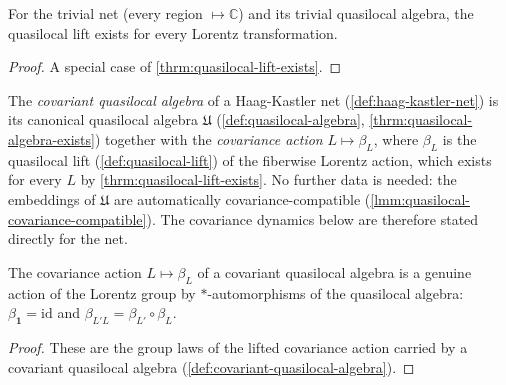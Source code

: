 \begin{theorem}
    \label{thrm:quasilocal-lift-trivial}
    \leanok
    For the trivial net (every region $\mapsto \mathbb{C}$) and its trivial quasilocal algebra, the quasilocal lift exists for every Lorentz transformation.
\end{theorem}
\begin{proof}
    \leanok
    A special case of \ref{thrm:quasilocal-lift-exists}.
\end{proof}

\begin{definition}
    \label{def:covariant-quasilocal-algebra}
    \leanok
    The \emph{covariant quasilocal algebra} of a Haag-Kastler net (\ref{def:haag-kastler-net}) is its canonical quasilocal algebra $\mathfrak{U}$ (\ref{def:quasilocal-algebra}, \ref{thrm:quasilocal-algebra-exists}) together with the \emph{covariance action} $L \mapsto \beta_L$, where $\beta_L$ is the quasilocal lift (\ref{def:quasilocal-lift}) of the fiberwise Lorentz action, which exists for every $L$ by \ref{thrm:quasilocal-lift-exists}. No further data is needed: the embeddings of $\mathfrak{U}$ are automatically covariance-compatible (\ref{lmm:quasilocal-covariance-compatible}). The covariance dynamics below are therefore stated directly for the net.
\end{definition}

\begin{lemma}
    \label{lmm:quasilocal-action-coherence}
    \leanok
    The covariance action $L \mapsto \beta_L$ of a covariant quasilocal algebra is a genuine action of the Lorentz group by $*$-automorphisms of the quasilocal algebra: $\beta_{\mathbf{1}} = \mathrm{id}$ and $\beta_{L'L} = \beta_{L'} \circ \beta_L$.
\end{lemma}
\begin{proof}
    \leanok
    These are the group laws of the lifted covariance action carried by a covariant quasilocal algebra (\ref{def:covariant-quasilocal-algebra}).
\end{proof}

